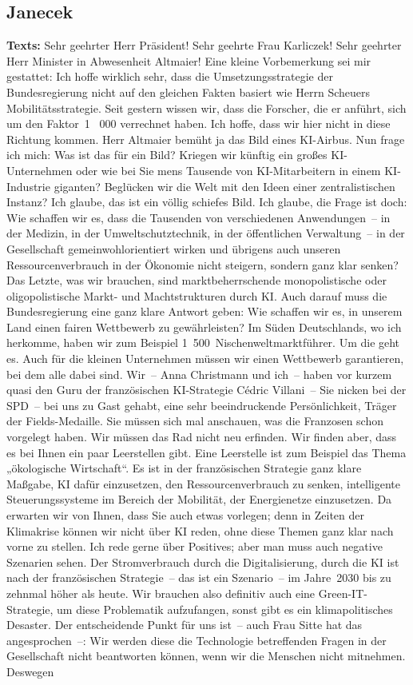 \documentclass{article}
\begin{document}
\subsection{Janecek}
\noindent\textbf{Texts:} Sehr geehrter Herr Präsident! Sehr geehrte Frau Karliczek! Sehr geehrter Herr Minister in Abwesenheit Altmaier! Eine kleine Vorbemerkung sei mir gestattet: Ich hoffe wirklich sehr, dass die Umsetzungsstrategie der Bundesregierung nicht auf den gleichen Fakten basiert wie Herrn Scheuers Mobilitätsstrategie.  Seit gestern wissen wir, dass die Forscher, die er anführt, sich um den Faktor 1  000 verrechnet haben. Ich hoffe, dass wir hier nicht in diese Richtung kommen.  Herr Altmaier bemüht ja das Bild eines KI-Airbus. Nun frage ich mich: Was ist das für ein Bild? Kriegen wir künftig ein großes KI-Unternehmen oder wie bei Sie mens Tausende von KI-Mitarbeitern in einem KI-Industrie giganten? Beglücken wir die Welt mit den Ideen einer zentralistischen Instanz? Ich glaube, das ist ein völlig schiefes Bild. Ich glaube, die Frage ist doch: Wie schaffen wir es, dass die Tausenden von verschiedenen Anwendungen – in der Medizin, in der Umweltschutztechnik, in der öffentlichen Verwaltung – in der Gesellschaft gemeinwohlorientiert wirken und übrigens auch unseren Ressourcenverbrauch in der Ökonomie nicht steigern, sondern ganz klar senken?  Das Letzte, was wir brauchen, sind marktbeherrschende monopolistische oder oligopolistische Markt- und Machtstrukturen durch KI. Auch darauf muss die Bundesregierung eine ganz klare Antwort geben: Wie schaffen wir es, in unserem Land einen fairen Wettbewerb zu gewährleisten? Im Süden Deutschlands, wo ich herkomme, haben wir zum Beispiel 1 500 Nischenweltmarktführer. Um die geht es. Auch für die kleinen Unternehmen müssen wir einen Wettbewerb garantieren, bei dem alle dabei sind.  Wir – Anna Christmann und ich – haben vor kurzem quasi den Guru der französischen KI-Strategie Cédric Villani – Sie nicken bei der SPD – bei uns zu Gast gehabt, eine sehr beeindruckende Persönlichkeit, Träger der Fields-Medaille. Sie müssen sich mal anschauen, was die Franzosen schon vorgelegt haben. Wir müssen das Rad nicht neu erfinden. Wir finden aber, dass es bei Ihnen ein paar Leerstellen gibt. Eine Leerstelle ist zum Beispiel das Thema „ökologische Wirtschaft“. Es ist in der französischen Strategie ganz klare Maßgabe, KI dafür einzusetzen, den Ressourcenverbrauch zu senken, intelligente Steuerungssysteme im Bereich der Mobilität, der Energienetze einzusetzen. Da erwarten wir von Ihnen, dass Sie auch etwas vorlegen; denn in Zeiten der Klimakrise können wir nicht über KI reden, ohne diese Themen ganz klar nach vorne zu stellen.  Ich rede gerne über Positives; aber man muss auch negative Szenarien sehen. Der Stromverbrauch durch die Digitalisierung, durch die KI ist nach der französischen Strategie – das ist ein Szenario – im Jahre 2030 bis zu zehnmal höher als heute. Wir brauchen also definitiv auch eine Green-IT-Strategie, um diese Problematik aufzufangen, sonst gibt es ein klimapolitisches Desaster.  Der entscheidende Punkt für uns ist – auch Frau Sitte hat das angesprochen –: Wir werden diese die Technologie betreffenden Fragen in der Gesellschaft nicht beantworten können, wenn wir die Menschen nicht mitnehmen. Deswegen 
\end{document}
